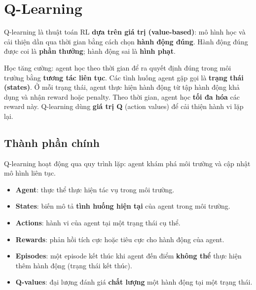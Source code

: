 \section{Q-Learning}
\label{sec:q-learning}

\begin{dinhnghia}[title={Q-Learning}]
Q-learning là thuật toán RL \textbf{dựa trên giá trị (value-based)}: mô hình học và cải thiện dần qua thời gian bằng cách chọn \textbf{hành động đúng}.
Hành động đúng được coi là \textbf{phần thưởng}; hành động sai là \textbf{hình phạt}.
\end{dinhnghia}

\begin{ynghia}[title={Q-Learning trong bối cảnh RL}]
Học tăng cường: agent học theo thời gian để ra quyết định đúng trong môi trường bằng \textbf{tương tác liên tục}.
Các tình huống agent gặp gọi là \textbf{trạng thái (states)}.
Ở mỗi trạng thái, agent thực hiện hành động từ tập hành động khả dụng và nhận reward hoặc penalty.
Theo thời gian, agent học \textbf{tối đa hóa} các reward này.
Q-learning dùng \textbf{giá trị Q} (action values) để cải thiện hành vi lặp lại.
\end{ynghia}

\subsection{Thành phần chính}

\begin{phuongphap}[title={Các thành phần Q-Learning}]
Q-learning hoạt động qua quy trình lặp: agent khám phá môi trường và cập nhật mô hình liên tục.
\begin{itemize}
  \item \textbf{Agent}: thực thể thực hiện tác vụ trong môi trường.
  \item \textbf{States}: biến mô tả \textbf{tình huống hiện tại} của agent trong môi trường.
  \item \textbf{Actions}: hành vi của agent tại một trạng thái cụ thể.
  \item \textbf{Rewards}: phản hồi tích cực hoặc tiêu cực cho hành động của agent.
  \item \textbf{Episodes}: một episode kết thúc khi agent đến điểm \textbf{không thể} thực hiện thêm hành động (trạng thái kết thúc).
  \item \textbf{Q-values}: đại lượng đánh giá \textbf{chất lượng} một hành động tại một trạng thái.
\end{itemize}
\end{phuongphap}

